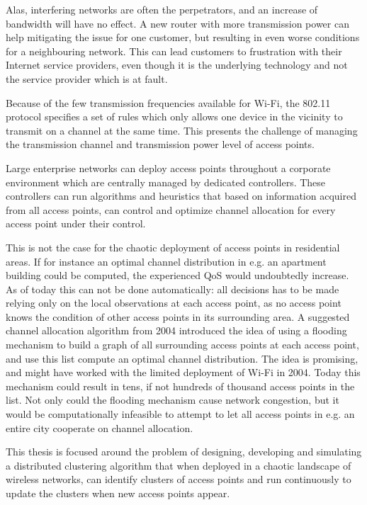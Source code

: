 Alas, interfering networks are often the perpetrators, and an increase of bandwidth will have no effect. A new router with more transmission power can help mitigating the issue
for one customer, but resulting in even worse conditions for a neighbouring network. This can lead customers to frustration with their Internet service providers, even though it is the underlying technology and not the service provider which is at fault.


Because of the few transmission frequencies available for Wi-Fi, the 802.11 protocol specifies a set of rules which only allows one device in the vicinity to transmit on a channel at the same time. 
This presents the challenge of managing the transmission channel and transmission power level of access points.

Large enterprise networks can deploy access points throughout a corporate environment which are centrally managed by dedicated controllers. These controllers can run 
algorithms and heuristics that based on information acquired from all access points, can control and optimize channel allocation for every access point under their control. 

This is not the case for the chaotic deployment of access points in residential areas. If for instance an optimal channel distribution in e.g. an apartment building could be computed,
the experienced QoS would undoubtedly increase. As of today this can not be done automatically: all decisions 
has to be made relying only on the local observations at each access point, as no access point knows the condition of other access points in its surrounding area. A suggested channel allocation algorithm from 2004 \cite{mahonen} introduced the idea of using a flooding mechanism to build a graph of all surrounding access points at each access point,
and use this list compute an optimal channel distribution. The idea is promising, and might have worked with the limited deployment of Wi-Fi in 2004.
Today this mechanism could result in tens, if not hundreds of thousand access points in the list. Not only could the flooding mechanism cause network congestion, but it would be computationally infeasible to attempt to let all access points in e.g. an entire city cooperate on channel allocation. 

This thesis is focused around the problem of designing, developing and simulating a distributed clustering algorithm that
when deployed in a chaotic landscape of wireless networks, can identify clusters of access points and run continuously to update the clusters when new access points appear. 




